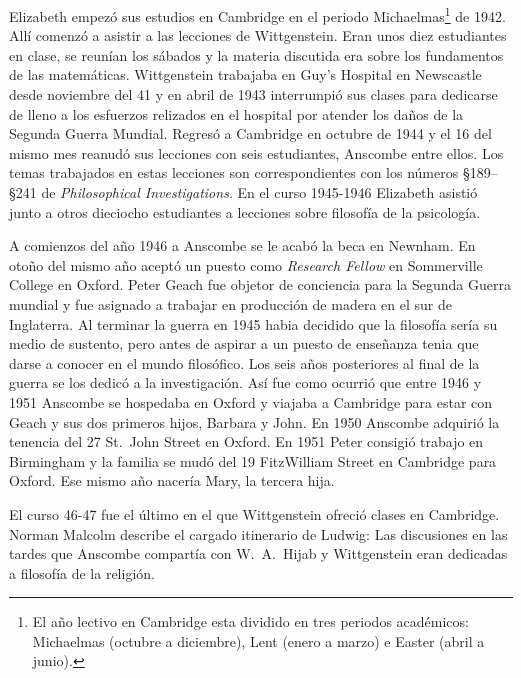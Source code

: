 Elizabeth empezó sus estudios en Cambridge en el periodo
Michaelmas\footnote{El año lectivo en Cambridge esta dividido en tres periodos
  académicos: Michaelmas (octubre a diciembre), Lent (enero a marzo) e Easter
  (abril a junio).} de 1942. Allí comenzó a asistir a las lecciones de
Wittgenstein. Eran unos diez estudiantes en clase, se reunían los sábados y la
materia discutida era sobre los fundamentos de las matemáticas. Wittgenstein
trabajaba en Guy's Hospital en Newscastle desde noviembre del 41 y en abril de
1943 interrumpió sus clases para dedicarse de lleno a los esfuerzos relizados
en el hospital por atender los daños de la Segunda Guerra Mundial. Regresó a
Cambridge en octubre de 1944 y el 16 del mismo mes reanudó sus lecciones con
seis estudiantes, Anscombe entre ellos. Los temas trabajados en estas
lecciones son correspondientes con los números \S189--\S241 de \emph{Philosophical
Investigations}. En el curso 1945-1946 Elizabeth asistió junto a otros
dieciocho estudiantes a lecciones sobre filosofía de la
psicología.\autocite[cf.~][pp.~354-356]{pubnpriv}

A comienzos del año 1946 a Anscombe se le acabó la beca en Newnham. En otoño del
mismo año aceptó un puesto como \emph{Research Fellow} en Sommerville College en
Oxford. Peter Geach fue objetor de conciencia para la Segunda Guerra mundial y
fue asignado a trabajar en producción de madera en el sur de
Inglaterra.\autocite[cf.~][p.~34]{teichman2002fellows} Al terminar la guerra en
1945 habia decidido que la filosofía sería su medio de sustento, pero antes de
aspirar a un puesto de enseñanza tenia que darse a conocer en el mundo
filosófico.\autocite[cf.~][p.~12]{phiaut} Los seis años posteriores al final de
la guerra se los dedicó a la investigación. Así fue como ocurrió que entre 1946
y 1951 Anscombe se hospedaba en Oxford y viajaba a Cambridge para estar con
Geach y sus dos primeros hijos, Barbara y John. En 1950 Anscombe adquirió la
tenencia del 27 St.~John Street en Oxford. En 1951 Peter consigió trabajo en
Birmingham y la familia se mudó del 19 FitzWilliam Street en Cambridge para
Oxford.\autocite[cf.~][p.~208]{NWR} Ese mismo año nacería Mary, la tercera hija.

El curso 46-47 fue el último en el que Wittgenstein ofreció clases en Cambridge.
Norman Malcolm describe el cargado itinerario de Ludwig:
Las discusiones en las tardes que Anscombe compartía con W.~A.~Hijab y
Wittgenstein eran dedicadas a filosofía de la religión.

